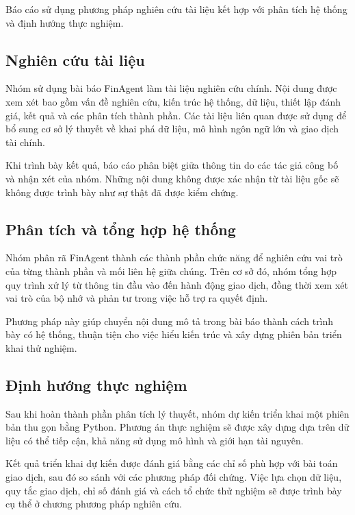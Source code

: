 Báo cáo sử dụng phương pháp nghiên cứu tài liệu kết hợp với phân tích hệ thống và định hướng thực nghiệm.

\subsection{Nghiên cứu tài liệu}

Nhóm sử dụng bài báo FinAgent làm tài liệu nghiên cứu chính. Nội dung được xem xét bao gồm vấn đề nghiên cứu, kiến trúc hệ thống, dữ liệu, thiết lập đánh giá, kết quả và các phân tích thành phần. Các tài liệu liên quan được sử dụng để bổ sung cơ sở lý thuyết về khai phá dữ liệu, mô hình ngôn ngữ lớn và giao dịch tài chính.

Khi trình bày kết quả, báo cáo phân biệt giữa thông tin do các tác giả công bố và nhận xét của nhóm. Những nội dung không được xác nhận từ tài liệu gốc sẽ không được trình bày như sự thật đã được kiểm chứng.

\subsection{Phân tích và tổng hợp hệ thống}

Nhóm phân rã FinAgent thành các thành phần chức năng để nghiên cứu vai trò của từng thành phần và mối liên hệ giữa chúng. Trên cơ sở đó, nhóm tổng hợp quy trình xử lý từ thông tin đầu vào đến hành động giao dịch, đồng thời xem xét vai trò của bộ nhớ và phản tư trong việc hỗ trợ ra quyết định.

Phương pháp này giúp chuyển nội dung mô tả trong bài báo thành cách trình bày có hệ thống, thuận tiện cho việc hiểu kiến trúc và xây dựng phiên bản triển khai thử nghiệm.

\subsection{Định hướng thực nghiệm}

Sau khi hoàn thành phần phân tích lý thuyết, nhóm dự kiến triển khai một phiên bản thu gọn bằng Python. Phương án thực nghiệm sẽ được xây dựng dựa trên dữ liệu có thể tiếp cận, khả năng sử dụng mô hình và giới hạn tài nguyên.

Kết quả triển khai dự kiến được đánh giá bằng các chỉ số phù hợp với bài toán giao dịch, sau đó so sánh với các phương pháp đối chứng. Việc lựa chọn dữ liệu, quy tắc giao dịch, chỉ số đánh giá và cách tổ chức thử nghiệm sẽ được trình bày cụ thể ở chương phương pháp nghiên cứu.


